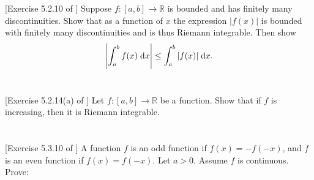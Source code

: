 \documentclass[11pt,letterpaper]{article}
\begin{document}



\section{} [Exercise 5.2.10 of \cite{Lebl_23}] 
Suppose $f:[a,b]\to\mathbb{R}$ is bounded and has finitely many discontinuities. Show that as a function of $x$ the expression $|f(x)|$ is bounded with finitely many discontinuities and is thus Riemann integrable. Then show
\begin{align}
    \left| \int^b_a f(x)\;\mathrm{d} x \right| \leq \int^b_a |f(x)|\;\mathrm{d} x.
\end{align}

\section{} [Exercise 5.2.14(a) of \cite{Lebl_23}] 
Let $f:[a,b]\to\mathbb{R}$ be a  function. Show that if $f$ is increasing, then it is Riemann integrable.

\section{} [Exercise 5.3.10 of \cite{Lebl_23}] 
A function $f$ is an odd function if $f(x)=-f(-x)$, and $f$ is an even function if $f(x)=f(-x)$. Let $a> 0$. Assume $f$ is continuous. Prove:
\end{document}
